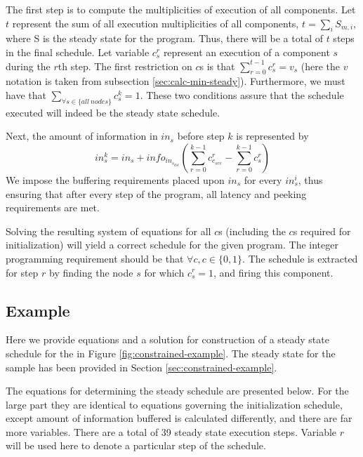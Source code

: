 The first step is to compute the multiplicities of execution of
all components.  Let $t$ represent the sum of all execution
multiplicities of all components, $t = \sum_{i} S_{m,i}$, where S
is the steady state for the program. Thus, there will be a total
of $t$ steps in the final schedule. Let variable $c^r_s$ represent
an execution of a component $s$ during the $r$th step. The first
restriction on $c$s is that $\sum_{r=0}^{t-1} c^r_s = v_s$ (here
the $v$ notation is taken from subsection
\ref{sec:calc-min-steady}). Furthermore, we must have that
$\sum_{\forall s \in \{all\ nodes\}} c^k_s = 1$. These two
conditions assure that the schedule executed will indeed be the
steady state schedule.

Next, the amount of information in {\Channel} $in_s$ before step $k$
is represented by $$in^k_s = in_s + info_{in_{s_{dst}}}
\left(\sum_{r=0}^{k-1} c^r_{c_{src}} - \sum_{r=0}^{k-1}
c^r_s\right)$$ We impose the buffering requirements placed upon
$in_s$ for every $in^i_s$, thus ensuring that after every step of
the program, all latency and peeking requirements are met.

Solving the resulting system of equations for all $c$s (including
the $c$s required for initialization) will yield a correct
schedule for the given program.  The integer programming
requirement should be that $\forall c, c \in \{0, 1\}$.  The
schedule is extracted for step $r$ by finding the node $s$ for
which $c^r_s = 1$, and firing this component.

\subsection{Example}
\label{sec:constrained:numbers}

Here we provide equations and a solution for construction of a
steady state schedule for the {\pipeline} in Figure
\ref{fig:constrained-example}. The steady state for the sample
{\pipeline} has been provided in Section
\ref{sec:constrained-example}.

The equations for determining the steady schedule are presented
below.  For the large part they are identical to equations
governing the initialization schedule, except amount of
information buffered is calculated differently, and there are far
more variables.  There are a total of 39 steady state execution
steps.  Variable $r$ will be used here to denote a particular step
of the schedule.

